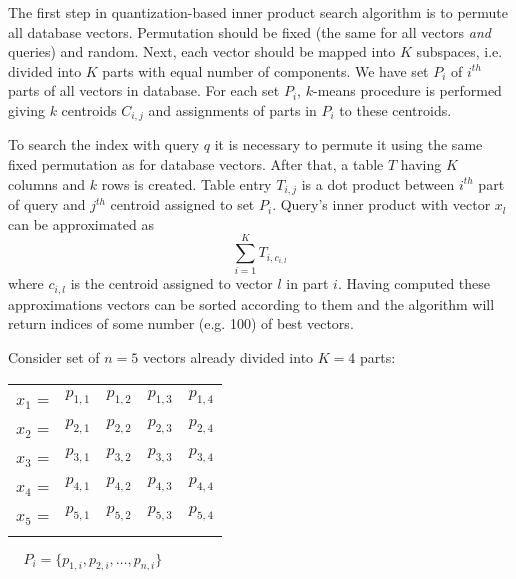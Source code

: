 The first step in quantization-based inner product search algorithm \cite{quantization} is to permute all database vectors.
Permutation should be fixed (the same for all vectors \textit{and} queries) and random.
Next, each vector should be mapped into $K$ subspaces, i.e. divided into $K$ parts with equal number of components.
We have set $P_i$ of $i^{th}$ parts of all vectors in database.
For each set $P_i$, $k$-means procedure is performed giving $k$ centroids $C_{i,j}$ and assignments of parts in $P_i$ to these centroids.
\par
To search the index with query $q$ it is necessary to permute it using the same fixed permutation as for database vectors.
After that, a table $T$ having $K$ columns and $k$ rows is created.
Table entry $T_{i,j}$ is a dot product between $i^{th}$ part of query and $j^{th}$ centroid assigned to set $P_i$.
Query's inner product with vector $x_l$ can be approximated as $$\sum_{i=1}^{K} T_{i,c_{i,l}}$$
where $c_{i,l}$ is the centroid assigned to vector $l$ in part $i$. Having computed these approximations vectors can be sorted according to them and the algorithm will return indices of some number (e.g. 100) of best vectors.
\par
Consider set of $n = 5$ vectors already divided into $K = 4$ parts:
\begin{center}
\renewcommand{\arraystretch}{1.2}
\begin{tabular}{c|c|c|c|c|}
\hhline{~----}
$x_1$ = & $p_{1,1}$ & $p_{1,2}$ & $p_{1,3}$ & $p_{1,4}$ \\
\hhline{~----}
$x_2$ = & $p_{2,1}$ & $p_{2,2}$ & $p_{2,3}$ & $p_{2,4}$ \\
\hhline{~----}
$x_3$ = & $p_{3,1}$ & $p_{3,2}$ & $p_{3,3}$ & $p_{3,4}$ \\
\hhline{~----}
$x_4$ = & $p_{4,1}$ & $p_{4,2}$ & $p_{4,3}$ & $p_{4,4}$ \\
\hhline{~----}
$x_5$ = & $p_{5,1}$ & $p_{5,2}$ & $p_{5,3}$ & $p_{5,4}$ \\
\hhline{~----}
\end{tabular}
$\ \ \ \ \ P_i = \{ p_{1,i}, p_{2,i}, \ldots, p_{n,i} \}$ \\
\end{center}

\smallskip

